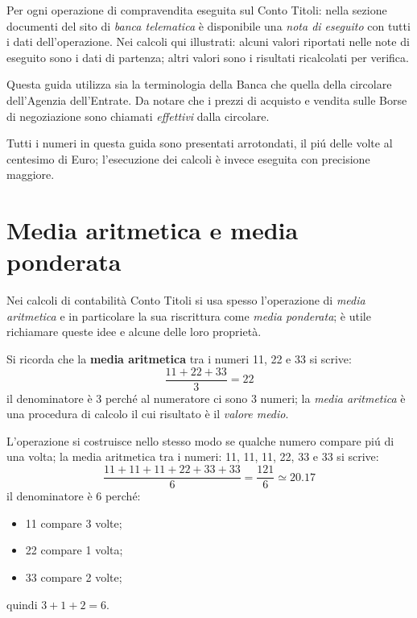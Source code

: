 \documentclass[12pt,a4paper]{article}
\begin{document}
Per ogni operazione di compravendita eseguita sul  Conto Titoli: nella sezione documenti del sito di
\emph{banca telematica} è disponibile una \emph{nota  di eseguito} con tutti i dati dell'operazione.
Nei calcoli qui illustrati: alcuni valori riportati nelle  note di eseguito sono i dati di partenza;
altri valori sono i risultati ricalcolati per verifica.

Questa  guida utilizza  sia la  terminologia  della Banca  che quella  della circolare  dell'Agenzia
dell'Entrate.   Da notare  che i  prezzi di  acquisto  e vendita  sulle Borse  di negoziazione  sono
chiamati \emph{effettivi} dalla circolare.

Tutti i numeri in questa guida sono presentati arrotondati, il piú delle volte al centesimo di Euro;
l'esecuzione dei calcoli è invece eseguita con precisione maggiore.

\section{Media aritmetica e media ponderata}


Nei calcoli di contabilità  Conto Titoli si usa spesso l'operazione di  \emph{media aritmetica} e in
particolare la sua riscrittura come \emph{media ponderata};  è utile richiamare queste idee e alcune
delle loro proprietà.

Si ricorda che la \textbf{media aritmetica} tra i numeri \num{11}, \num{22} e \num{33} si scrive:
\begin{equation*}
  \frac{\num{11} + \num{22} + \num{33}}{3} = \num{22}
\end{equation*}
il denominatore è \num{3} perché al numeratore  ci sono \num{3} numeri; la \emph{media aritmetica} è
una procedura di calcolo il cui risultato è il \emph{valore medio}.

L'operazione si costruisce  nello stesso modo se qualche  numero compare piú di una  volta; la media
aritmetica tra i numeri: \num{11}, \num{11}, \num{11}, \num{22}, \num{33} e \num{33} si scrive:
\begin{equation*}
  \frac{\num{11} + \num{11} + \num{11} + \num{22} + \num{33} + \num{33}}{6}
  = \frac{121}{6} \simeq \num{20,17}
\end{equation*}
il denominatore è \num{6} perché:
\begin{itemize}
\item \num{11} compare \num{3} volte;
\item \num{22} compare \num{1} volta;
\item \num{33} compare \num{2} volte;
\end{itemize}
quindi \(\num{3} + \num{1} + \num{2} = \num{6}\).
\end{document}
